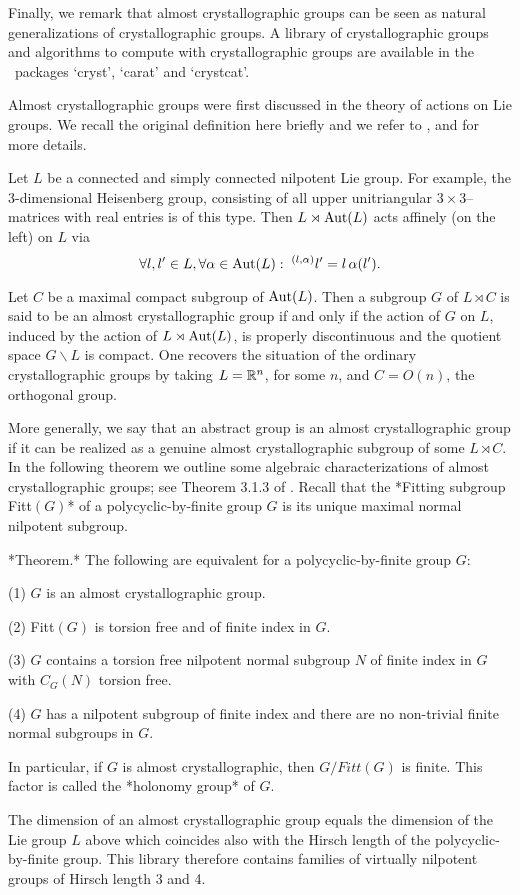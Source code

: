 Finally, we remark that almost crystallographic groups can be seen as natural 
generalizations of crystallographic groups. A library of crystallographic 
groups and algorithms to compute with crystallographic groups are available 
in the \GAP\ packages `cryst', `carat' and `crystcat'. 


Almost crystallographic groups were first discussed in the theory of 
actions on Lie groups.  We recall the original definition here briefly
and we refer to \cite{AUS}, \cite{KD} and \cite{LEE} for more details. 

Let $L$ be a connected and simply connected nilpotent Lie group. For 
example, the 3-dimensional Heisenberg group, consisting of all upper 
unitriangular $3\times3$--matrices with real entries is of this type.
Then $L\rtimes {\rm Aut}(L)$ acts affinely (on the left) on $L$ via
$$ \forall l,l'\in L,\forall \alpha \in {\rm Aut}(L):\; 
   ^{(l,\alpha)}l'=l \, \alpha(l').  $$

Let $C$ be a maximal compact subgroup of ${\rm Aut}(L)$. Then a subgroup $G$ 
of $L \rtimes C$ is said to be an almost crystallographic group if and only 
if the action of $G$ on $L$, induced by the action of $L\rtimes {\rm Aut}(L)$,
is properly discontinuous and the quotient space $G \backslash L$ is compact. 
One recovers the situation of the ordinary crystallographic groups by taking 
$L={\Bbb R}^n$, for some $n$, and $C=O(n)$, the orthogonal group.

More generally, we say that an abstract group is an almost crystallographic
group if it can be realized as a genuine almost crystallographic subgroup 
of some $L \rtimes C$. In the following theorem we outline some algebraic 
characterizations of almost crystallographic groups; see Theorem 3.1.3 of 
\cite{KD}. Recall that the *Fitting subgroup Fitt$(G)$* of a 
polycyclic-by-finite group $G$ is its unique maximal normal nilpotent 
subgroup.

*Theorem.*
The following are equivalent for a polycyclic-by-finite group $G$:
\beginlist
\item{(1)} $G$ is an almost crystallographic group.
\item{(2)} Fitt$(G)$ is torsion free and of finite index in $G$.
\item{(3)} $G$ contains a torsion free nilpotent normal subgroup $N$
of finite index in $G$ with $C_G(N)$ torsion free.
\item{(4)} $G$ has a nilpotent subgroup of finite index and there
are no non-trivial finite normal subgroups in $G$.
\endlist

In particular, if $G$ is almost crystallographic, then $G / Fitt(G)$
is finite. This factor is called the *holonomy group* of $G$. 

The dimension of an almost crystallographic group equals the dimension
of the Lie group $L$ above which coincides also with the Hirsch length 
of the polycyclic-by-finite group. This library therefore contains 
families of virtually nilpotent groups of Hirsch length 3 and 4. 

